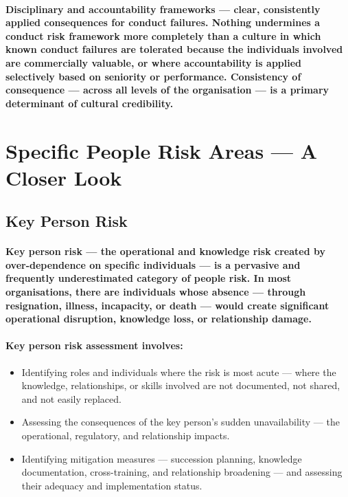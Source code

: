 \paragraph{\textbf{Disciplinary and accountability frameworks} — clear, consistently applied consequences for conduct failures. Nothing undermines a conduct risk framework more completely than a culture in which known conduct failures are tolerated because the individuals involved are commercially valuable, or where accountability is applied selectively based on seniority or performance. Consistency of consequence — across all levels of the organisation — is a primary determinant of cultural credibility.}

\section{Specific People Risk Areas — A Closer Look}

\subsection{Key Person Risk}
\paragraph{\textbf{Key person risk} — the operational and knowledge risk created by over-dependence on specific individuals — is a pervasive and frequently underestimated category of people risk. In most organisations, there are individuals whose absence — through resignation, illness, incapacity, or death — would create significant operational disruption, knowledge loss, or relationship damage.}
\paragraph{Key person risk assessment involves:}
\begin{itemize}
    \item{Identifying roles and individuals where the risk is most acute — where the knowledge, relationships, or skills involved are not documented, not shared, and not easily replaced.}
    \item{Assessing the consequences of the key person's sudden unavailability — the operational, regulatory, and relationship impacts.}
    \item{Identifying mitigation measures — succession planning, knowledge documentation, cross-training, and relationship broadening — and assessing their adequacy and implementation status.}
\end{itemize}
